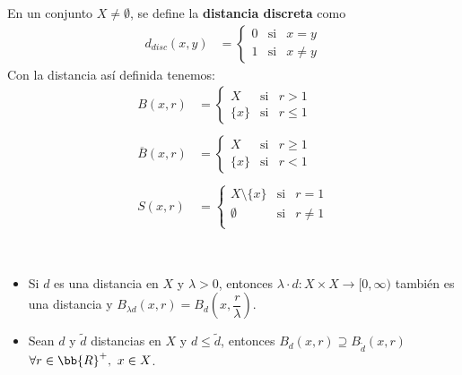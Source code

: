 \begin{ejemplo}
    En un conjunto $X \neq \emptyset$, se define la \textbf{distancia discreta} como 
    \begin{align*}
        d_{disc}(x,y) &=
        \left\{ 
        \begin{array}{ccc}
            0 & \text{si} & x=y\\
            1 & \text{si} & x\neq y
        \end{array}
        \right. 
    \end{align*}
    Con la distancia así definida tenemos:
    \begin{align*}
        B(x,r) &=
        \left\{ 
        \begin{array}{ccc}
            X & \text{si} & r>1\\
            \{x\} & \text{si} & r \leq 1
        \end{array}
        \right. \\\\
        \overline{B}(x,r) &=
        \left\{ 
        \begin{array}{ccc}
            X & \text{si} & r \geq 1\\
            \{x\} & \text{si} & r < 1
        \end{array}
        \right.\\\\
        S(x,r) &=
        \left\{ 
        \begin{array}{ccc}
            X \setminus \{x\} & \text{si} & r =1 \\
            \emptyset & \text{si} & r \neq 1\\
        \end{array}
        \right.
    \end{align*}
    \endsquare
\end{ejemplo}


\begin{ejemplo}\
    \begin{itemize}
        \item Si $d$ es una distancia en $X$ y $\lambda > 0$, entonces $\lambda \cdot d : X \times X \rightarrow [0,\infty)$ también es una distancia y $B_{\lambda d}(x,r) = B_d\left(x, \dfrac{r}{\lambda}\right)$.
        \item Sean $d$ y $\tilde{d}$ distancias en $X$ y $d \leq \tilde{d}$, entonces $B_d(x,r) \supseteq B_{\tilde{d}}(x,r)$ \ $\forall r \in \bb{R}^+,\ x\in X$.
    \end{itemize}
    \endsquare
\end{ejemplo}

